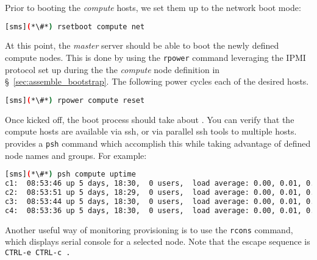 Prior to booting the {\em compute} hosts, we set them up to the network boot
mode:

\begin{lstlisting}[language=bash,keywords={},upquote=true]
[sms](*\#*) rsetboot compute net
\end{lstlisting} 

At this point, the {\em master} server should be able to boot the newly defined
compute nodes. This is done by using the \texttt{rpower} \xCAT{} command
leveraging the IPMI protocol set up during the the {\em compute} node definition
in \S~\ref{sec:assemble_bootstrap}. The following power cycles each of the
desired hosts.


\begin{lstlisting}[language=bash,keywords={},upquote=true]
[sms](*\#*) rpower compute reset
\end{lstlisting} 

Once kicked off, the boot process should take about .  You can verify that
the compute hosts are available via ssh, or via parallel ssh tools to multiple
hosts.  \xCAT{} provides a \texttt{psh} command which accomplish this while
taking advantage of defined node names and groups. For example:

\begin{lstlisting}[language=bash]
[sms](*\#*) psh compute uptime
c1:  08:53:46 up 5 days, 18:30,  0 users,  load average: 0.00, 0.01, 0.05
c2:  08:53:51 up 5 days, 18:29,  0 users,  load average: 0.00, 0.01, 0.05
c3:  08:53:44 up 5 days, 18:30,  0 users,  load average: 0.00, 0.01, 0.05
c4:  08:53:36 up 5 days, 18:30,  0 users,  load average: 0.00, 0.01, 0.05
\end{lstlisting}
Another  useful way of monitoring provisioning is to use  the \texttt{rcons} command,
which displays serial console for a selected node. Note that the escape sequence
is \texttt{CTRL-e CTRL-c .} 
